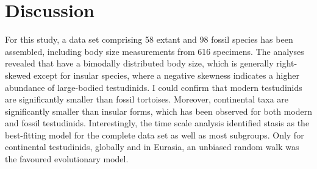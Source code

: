 \section{Discussion}

For this study, a data set comprising 58 extant and 98 fossil species has been assembled, including body size measurements from 616 specimens.
The analyses revealed that \T have a bimodally distributed body size, which is generally right-skewed except for insular species, where a negative skewness indicates a higher abundance of large-bodied testudinids.
I could confirm that modern testudinids are significantly smaller than fossil tortoises. Moreover, continental taxa are significantly smaller than insular forms, which has been observed for both modern and fossil testudinids.
Interestingly, the time scale analysis identified stasis as the best-fitting model for the complete data set as well as most subgroups. Only for continental testudinids, globally and in Eurasia, an unbiased random walk was the favoured evolutionary model.





